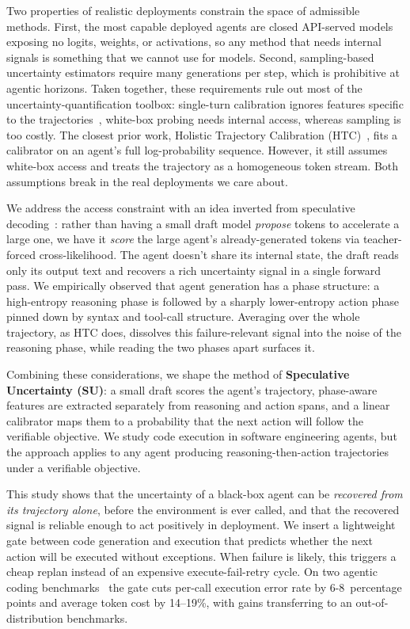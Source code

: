 \documentclass[11pt]{article}
\newcommand{\Hnumber}[1]{#1}
\begin{document}
Two properties of realistic deployments constrain the space of admissible
methods. First, the most capable deployed agents are closed
API-served models exposing no logits, weights, or activations, so any method
that needs internal signals is something that we cannot use for models. Second,
sampling-based uncertainty estimators require many generations per step, which
is prohibitive at agentic horizons. Taken together, these requirements rule out most of the
uncertainty-quantification toolbox: single-turn
calibration ignores features specific to the trajectories~\citep{guo2017calibration, kuhn2023semantic},
white-box probing needs internal access, whereas sampling is too costly. The
closest prior work, Holistic Trajectory Calibration
(HTC)~\citep{zhang2025htc}, fits a calibrator on an agent's full
log-probability sequence. However, it still assumes white-box access and treats the
trajectory as a homogeneous token stream. Both assumptions break in the real
deployments we care about.

We address the access constraint with an idea inverted from speculative
decoding~\citep{leviathan2023fast, chen2023accelerating}: rather than
having a small draft model \emph{propose} tokens to accelerate a large one, we
have it \emph{score} the large agent's already-generated tokens via
teacher-forced cross-likelihood. The agent doesn't share its internal state, the
draft reads only its output text and recovers a rich uncertainty signal in a
single forward pass. We empirically observed that agent
generation has a phase structure: a high-entropy reasoning phase is
followed by a sharply lower-entropy action phase pinned down by syntax
and tool-call structure. Averaging over
the whole trajectory, as HTC does, dissolves this failure-relevant signal into
the noise of the reasoning phase, while reading the two phases apart surfaces it.

Combining these considerations, we shape the method of \textbf{Speculative Uncertainty (SU)}: a small draft
scores the agent's trajectory, phase-aware features are extracted separately
from reasoning and action spans, and a linear calibrator maps them to a probability that the next action will follow the verifiable objective. We study code execution in software engineering agents, but the approach applies to any agent
producing reasoning-then-action trajectories under a verifiable objective.

This study shows that the uncertainty of a black-box agent can be
\emph{recovered from its trajectory alone}, before the environment is ever
called, and that the recovered signal is reliable enough to act positively
in deployment. We insert a
lightweight gate between code generation and execution that predicts whether
the next action will be executed without exceptions. When failure is likely, this triggers a
cheap replan instead of an expensive execute-fail-retry cycle. On two
agentic coding benchmarks~\citep{jimenez2024swebench, dacode} the gate cuts per-call execution error rate by
\Hnumber{6-8}~percentage points and average token cost by \Hnumber{14--19}\%, with gains
transferring to an out-of-distribution benchmarks.
\end{document}
